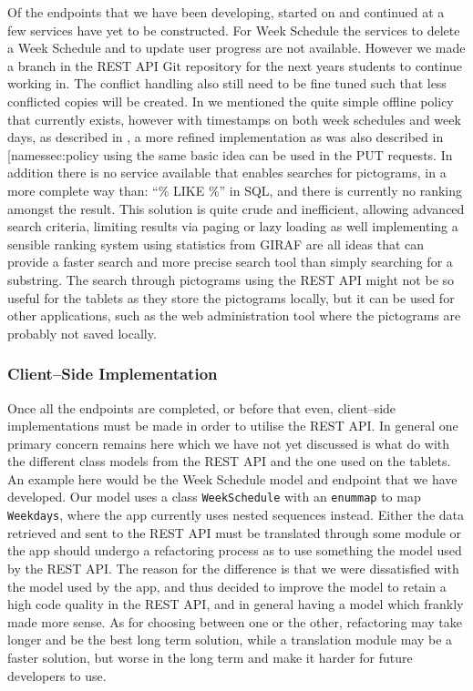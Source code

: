 Of the endpoints that we have been developing, started on  and continued at  a few services have yet to be constructed.
For Week Schedule the services to delete a Week Schedule and to update user progress are not available.
However we made a branch in the REST API Git repository for the next years students to continue working in.
The conflict handling also still need to be fine tuned such that less conflicted copies will be created.
In  we mentioned the quite simple offline policy that currently exists, however with timestamps on both week schedules and week days, as described in , a more refined implementation as was also described in \myref[name{ssec:policy} using the same basic idea can be used in the PUT requests.
In addition there is no service available that enables searches for pictograms, in a more complete way than: ``\% LIKE \%'' in SQL, and there is currently no ranking amongst the result.
This solution is quite crude and inefficient, allowing advanced search criteria, limiting results via paging or lazy loading as well implementing a sensible ranking system using statistics from GIRAF are all ideas that can provide a faster search and more precise search tool than simply searching for a substring.
The search through pictograms using the REST API might not be so useful for the tablets as they store the pictograms locally, but it can be used for other applications, such as the web administration tool where the pictograms are probably not saved locally.


\subsubsection*{Client--Side Implementation}
Once all the endpoints are completed, or before that even, client--side implementations must be made in order to utilise the REST API.
In general one primary concern remains here which we have not yet discussed is what do with the different class models from the REST API and the one used on the tablets.
An example here would be the Week Schedule model and endpoint that we have developed.
Our model uses a class \texttt{WeekSchedule} with an \texttt{enummap} to map \texttt{Weekdays}, where the app currently uses nested sequences instead.
Either the data retrieved and sent to the REST API must be translated through some module or the app should undergo a refactoring process as to use something the model used by the REST API.
The reason for the difference is that we were dissatisfied with the model used by the app, and thus decided to improve the model to retain a high code quality in the REST API, and in general having a model which frankly made more sense.
As for choosing between one or the other, refactoring may take longer and be the best long term solution, while a translation module may be a faster solution, but worse in the long term and make it harder for future developers to use.

